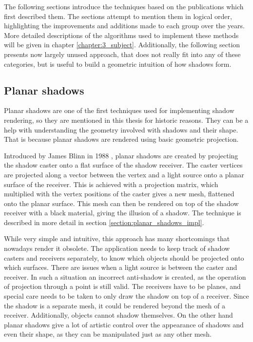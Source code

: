 The following sections introduce the techniques based on the publications which first described them. The sections attempt to mention them in logical order, highlighting the improvements and additions made to each group over the years. More detailed descriptions of the algorithms used to implement these methods will be given in chapter \ref{chapter:3_subject}. Additionally, the following section presents now largely unused approach, that does not really fit into any of these categories, but is useful to build a geometric intuition of how shadows form.

\subsection{Planar shadows} \label{section:planar_shadows}
Planar shadows are one of the first techniques used for implementing shadow rendering, so they are mentioned in this thesis for historic reasons. They can be a help with understanding the geometry involved with shadows and their shape. That is because planar shadows are rendered using basic geometric projection.

Introduced by James Blinn in 1988 \cite{bib:article:blinn_shadows}, planar shadows are created by projecting the shadow caster onto a flat surface of the shadow receiver. The caster vertices are projected along a vector between the vertex and a light source onto a planar surface of the receiver. This is achieved with a projection matrix, which multiplied with the vertex positions of the caster gives a new mesh, flattened onto the planar surface. This mesh can then be rendered on top of the shadow receiver with a black material, giving the illusion of a shadow. The technique is described in more detail in section \ref{section:planar_shadows_impl}.

While very simple and intuitive, this approach has many shortcomings that nowadays render it obsolete. The application needs to keep track of shadow casters and receivers separately, to know which objects should be projected onto which surfaces. There are issues when a light source is between the caster and receiver. In such a situation an incorrect anti-shadow is created, as the operation of projection through a point is still valid. The receivers have to be planes, and special care needs to be taken to only draw the shadow on top of a receiver. Since the shadow is a separate mesh, it could be rendered beyond the mesh of a receiver. Additionally, objects cannot shadow themselves. On the other hand planar shadows give a lot of artistic control over the appearance of shadows and even their shape, as they can be manipulated just as any other mesh.

